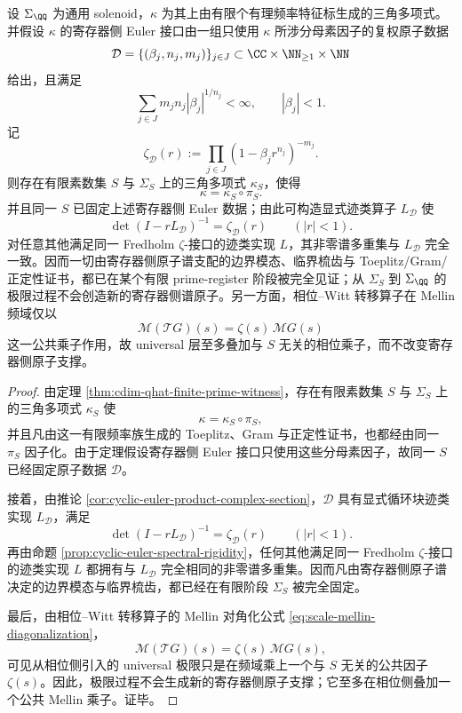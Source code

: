 \begin{theorem}\label{thm:conclusion-universal-solenoid-finite-witness-spectral-rigidity}
设 \(\Sigma_{\QQ}\) 为通用 solenoid，\(\kappa\) 为其上由有限个有理频率特征标生成的三角多项式。并假设 \(\kappa\) 的寄存器侧 Euler 接口由一组只使用 \(\kappa\) 所涉分母素因子的复权原子数据
\[
\mathcal D=\{(\beta_j,n_j,m_j)\}_{j\in J}\subset \CC\times\NN_{\ge 1}\times\NN
\]
给出，且满足
\[
\sum_{j\in J}m_jn_j|\beta_j|^{1/n_j}<\infty,
\qquad
|\beta_j|<1.
\]
记
\[
\zeta_{\mathcal D}(r):=\prod_{j\in J}(1-\beta_j r^{n_j})^{-m_j}.
\]
则存在有限素数集 \(S\) 与 \(\Sigma_S\) 上的三角多项式 \(\kappa_S\)，使得
\[
\kappa=\kappa_S\circ\pi_S.
\]
并且同一 \(S\) 已固定上述寄存器侧 Euler 数据；由此可构造显式迹类算子 \(L_{\mathcal D}\) 使
\[
\det(I-rL_{\mathcal D})^{-1}=\zeta_{\mathcal D}(r)
\qquad (|r|<1).
\]
对任意其他满足同一 Fredholm \(\zeta\)-接口的迹类实现 \(L\)，其非零谱多重集与 \(L_{\mathcal D}\) 完全一致。因而一切由寄存器侧原子谱支配的边界模态、临界梳齿与 Toeplitz/Gram/正定性证书，都已在某个有限 prime-register 阶段被完全见证；从 \(\Sigma_S\) 到 \(\Sigma_{\QQ}\) 的极限过程不会创造新的寄存器侧谱原子。另一方面，相位--Witt 转移算子在 Mellin 频域仅以
\[
\mathcal M(\mathcal T G)(s)=\zeta(s)\,\mathcal M G(s)
\]
这一公共乘子作用，故 universal 层至多叠加与 \(S\) 无关的相位乘子，而不改变寄存器侧原子支撑。
\end{theorem}
\begin{proof}
由定理 \ref{thm:cdim-qhat-finite-prime-witness}，存在有限素数集 \(S\) 与 \(\Sigma_S\) 上的三角多项式 \(\kappa_S\) 使
\[
\kappa=\kappa_S\circ\pi_S,
\]
并且凡由这一有限频率族生成的 Toeplitz、Gram 与正定性证书，也都经由同一 \(\pi_S\) 因子化。由于定理假设寄存器侧 Euler 接口只使用这些分母素因子，故同一 \(S\) 已经固定原子数据 \(\mathcal D\)。

接着，由推论 \ref{cor:cyclic-euler-product-complex-section}，\(\mathcal D\) 具有显式循环块迹类实现 \(L_{\mathcal D}\)，满足
\[
\det(I-rL_{\mathcal D})^{-1}=\zeta_{\mathcal D}(r)
\qquad (|r|<1).
\]
再由命题 \ref{prop:cyclic-euler-spectral-rigidity}，任何其他满足同一 Fredholm \(\zeta\)-接口的迹类实现 \(L\) 都拥有与 \(L_{\mathcal D}\) 完全相同的非零谱多重集。因而凡由寄存器侧原子谱决定的边界模态与临界梳齿，都已经在有限阶段 \(\Sigma_S\) 被完全固定。

最后，由相位--Witt 转移算子的 Mellin 对角化公式 \eqref{eq:scale-mellin-diagonalization}，
\[
\mathcal M(\mathcal T G)(s)=\zeta(s)\,\mathcal M G(s),
\]
可见从相位侧引入的 universal 极限只是在频域乘上一个与 \(S\) 无关的公共因子 \(\zeta(s)\)。因此，极限过程不会生成新的寄存器侧原子支撑；它至多在相位侧叠加一个公共 Mellin 乘子。证毕。
\end{proof}

